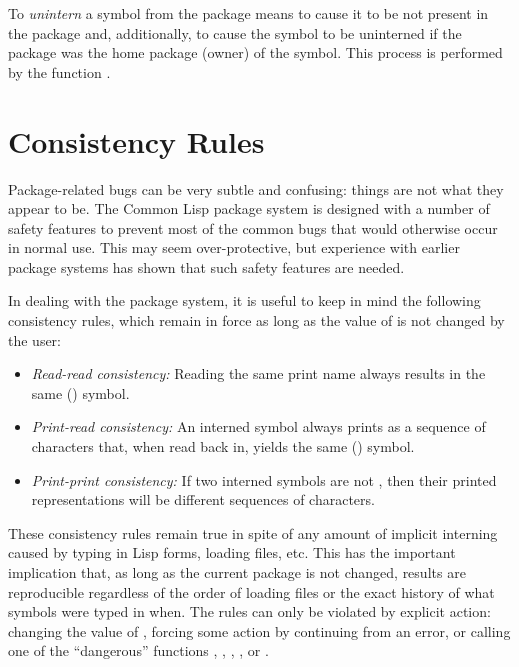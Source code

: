 To {\it unintern} a symbol from the package means to cause it to be not
present in the package
and, additionally, to cause the symbol to be uninterned if the
package was the home package (owner) of the symbol.
This process is performed by the function .

\section{Consistency Rules}

Package-related bugs can be very subtle and confusing: things are not
what they appear to be.  The Common Lisp package system is designed with
a number of safety features to prevent most of the common bugs that
would otherwise occur in normal use.  This may seem over-protective, but
experience with earlier package systems has shown that such safety
features are needed.

In dealing with the package system, it is useful to keep in mind the
following consistency rules, which remain in force as long as the value
of  is not changed by the user:

\begin{itemize}
\item
{\it Read-read consistency:} Reading the same print name always results in
the same () symbol.

\item
{\it Print-read consistency:} An interned symbol always prints as a
sequence of characters that, when read back in, yields the same ()
symbol.

\item
{\it Print-print consistency:} If two interned symbols are not , then
their printed representations will be different sequences of
characters.
\end{itemize}

These consistency rules remain true in spite of any amount of implicit
interning caused by typing in Lisp forms, loading files, etc.  This has
the important implication that, as long as the current package
is not changed, results are reproducible regardless of
the order of loading files or the exact history of what symbols were
typed in when.  The rules can only be violated by explicit action:
changing the value of , forcing some action by continuing
from an error, or calling one of the ``dangerous'' functions
, , ,
, or .

